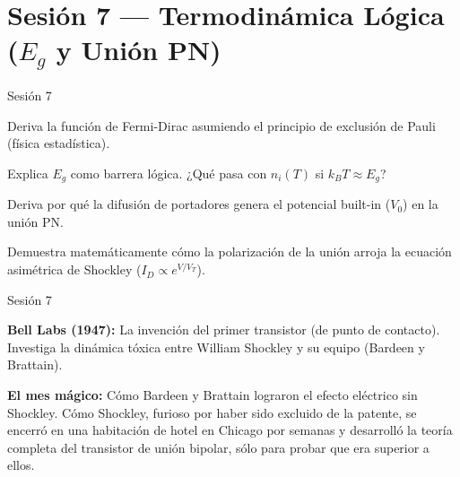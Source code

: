 \documentclass[11pt, letterpaper]{article}
\begin{document}
\newpage

\section{Sesi\'on 7 --- Termodin\'amica L\'ogica ($E_g$ y Uni\'on PN)}

\begin{verificacion}{Sesi\'on 7}
\begin{checklist}
  \item Deriva la funci\'on de Fermi-Dirac asumiendo el principio de exclusi\'on de Pauli (f\'isica estad\'istica).
  \item Explica $E_g$ como barrera l\'ogica. ¿Qu\'e pasa con $n_i(T)$ si $k_BT \approx E_g$?
  \item Deriva por qu\'e la difusi\'on de portadores genera el potencial built-in ($V_0$) en la uni\'on PN.
  \item Demuestra matem\'aticamente c\'omo la polarizaci\'on de la uni\'on arroja la ecuaci\'on asim\'etrica de Shockley ($I_D \propto e^{V/V_T}$).
\end{checklist}
\end{verificacion}

\begin{historia}{Sesi\'on 7}
\begin{checklist}
  \item \textbf{Bell Labs (1947):} La invenci\'on del primer transistor (de punto de contacto). Investiga la din\'amica t\'oxica entre William Shockley y su equipo (Bardeen y Brattain).
  \item \textbf{El mes m\'agico:} C\'omo Bardeen y Brattain lograron el efecto el\'ectrico sin Shockley. C\'omo Shockley, furioso por haber sido excluido de la patente, se encerr\'o en una habitaci\'on de hotel en Chicago por semanas y desarroll\'o la teor\'ia completa del transistor de uni\'on bipolar, s\'olo para probar que era superior a ellos.
\end{checklist}
\end{historia}
\end{document}
